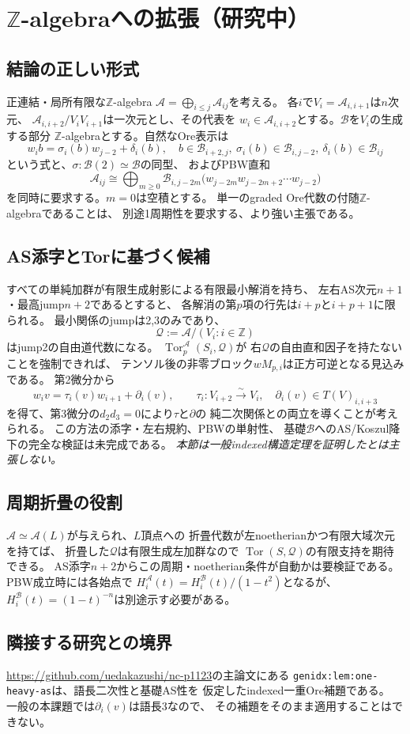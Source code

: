 \section{$\mathbb Z$-algebraへの拡張（研究中）}\label{sec:indexed}
\subsection{結論の正しい形式}
正連結・局所有限な$\mathbb Z$-algebra
$\mathcal A=\bigoplus_{i\le j}\mathcal A_{ij}$を考える。
各$i$で$V_i=\mathcal A_{i,i+1}$は$n$次元、
$\mathcal A_{i,i+2}/V_iV_{i+1}$は一次元とし、その代表を
$w_i\in\mathcal A_{i,i+2}$とする。$\mathcal B$を$V_i$の生成する部分
$\mathbb Z$-algebraとする。自然なOre表示は
\[
 w_i b=\sigma_i(b)w_{j-2}+\delta_i(b),
 \quad b\in\mathcal B_{i+2,j},\
 \sigma_i(b)\in\mathcal B_{i,j-2},\
 \delta_i(b)\in\mathcal B_{ij}
\]
という式と、$\sigma:\mathcal B(2)\simeq\mathcal B$の同型、
およびPBW直和
\[
 \mathcal A_{ij}\cong
 \bigoplus_{m\ge0}\mathcal B_{i,j-2m}
 \bigl(w_{j-2m}w_{j-2m+2}\cdots w_{j-2}\bigr)
\]
を同時に要求する。$m=0$は空積とする。
単一のgraded Ore代数の付随$\mathbb Z$-algebraであることは、
別途1周期性を要求する、より強い主張である。

\subsection{AS添字とTorに基づく候補}
すべての単純加群が有限生成射影による有限最小解消を持ち、
左右AS次元$n+1$・最高jump$n+2$であるとすると、
各解消の第$p$項の行先は$i+p$と$i+p+1$に限られる。
最小関係のjumpは2,3のみであり、
\[
 \mathcal Q:=\mathcal A/(V_i:i\in\mathbb Z)
\]
はjump2の自由道代数になる。
$\operatorname{Tor}^{\mathcal A}_p(S_i,\mathcal Q)$が
右$\mathcal Q$の自由直和因子を持たないことを強制できれば、
テンソル後の非零ブロック$wM_{p,i}$は正方可逆となる見込みである。
第2微分から
\[
 w_i v=\tau_i(v)w_{i+1}+\partial_i(v),\qquad
 \tau_i:V_{i+2}\xrightarrow{\sim}V_i,\quad
 \partial_i(v)\in T(V)_{i,i+3}
\]
を得て、第3微分の$d_2d_3=0$により$\tau$と$\partial$の
純二次関係との両立を導くことが考えられる。
この方法の添字・左右規約、PBWの単射性、
基礎$\mathcal B$へのAS/Koszul降下の完全な検証は未完成である。
\emph{本節は一般indexed構造定理を証明したとは主張しない。}

\subsection{周期折畳の役割}
$\mathcal A\simeq\mathcal A(L)$が与えられ、$L$頂点への
折畳代数が左noetherianかつ有限大域次元を持てば、
折畳した$\mathcal Q$は有限生成左加群なので
$\operatorname{Tor}(S,\mathcal Q)$の有限支持を期待できる。
AS添字$n+2$からこの周期・noetherian条件が自動かは要検証である。
PBW成立時には各始点で
$H_i^{\mathcal A}(t)=H_i^{\mathcal B}(t)/(1-t^2)$となるが、
$H_i^{\mathcal B}(t)=(1-t)^{-n}$は別途示す必要がある。

\subsection{隣接する研究との境界}
\url{https://github.com/uedakazushi/nc-p1123}の主論文にある
\texttt{genidx:lem:one-heavy-as}は、語長二次性と基礎AS性を
仮定したindexed一重Ore補題である。
一般の本課題では$\partial_i(v)$は語長3なので、
その補題をそのまま適用することはできない。
